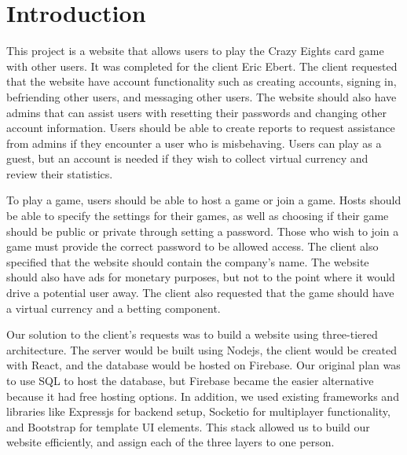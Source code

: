 \section{Introduction}





This project is a website that allows users to play the Crazy Eights card game with other users. It was completed for the client Eric Ebert. The client requested that the website have account functionality such as creating accounts, signing in, befriending other users, and messaging other users. The website should also have admins that can assist users with resetting their passwords and changing other account information. Users should be able to create reports to request assistance from admins if they encounter a user who is misbehaving. Users can play as a guest, but an account is needed if they wish to collect virtual currency and review their statistics.

To play a game, users should be able to host a game or join a game. Hosts should be able to specify the settings for their games, as well as choosing if their game should be public or private through setting a password. Those who wish to join a game must provide the correct password to be allowed access. The client also specified that the website should contain the company's name. The website should also have ads for monetary purposes, but not to the point where it would drive a potential user away. The client also requested that the game should have a virtual currency and a betting component.

Our solution to the client's requests was to build a website using three-tiered architecture. The server would be built using Nodejs, the client would be created with React, and the database would be hosted on Firebase. Our original plan was to use SQL to host the database, but Firebase became the easier alternative because it had free hosting options. In addition, we used existing frameworks and libraries like Expressjs for backend setup, Socketio for multiplayer functionality, and Bootstrap for template UI elements. This stack allowed us to build our website efficiently, and assign each of the three layers to one person.


